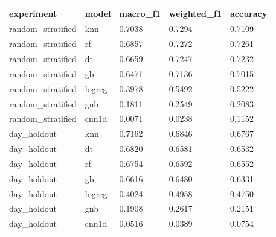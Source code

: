 \begin{tabular}{lllll}
\toprule
       experiment &  model & macro\_f1 & weighted\_f1 & accuracy \\
\midrule
random\_stratified &    knn &   0.7038 &      0.7294 &   0.7109 \\
random\_stratified &     rf &   0.6857 &      0.7272 &   0.7261 \\
random\_stratified &     dt &   0.6659 &      0.7247 &   0.7232 \\
random\_stratified &     gb &   0.6471 &      0.7136 &   0.7015 \\
random\_stratified & logreg &   0.3978 &      0.5492 &   0.5222 \\
random\_stratified &    gnb &   0.1811 &      0.2549 &   0.2083 \\
random\_stratified &  cnn1d &   0.0071 &      0.0238 &   0.1152 \\
      day\_holdout &    knn &   0.7162 &      0.6846 &   0.6767 \\
      day\_holdout &     dt &   0.6820 &      0.6581 &   0.6532 \\
      day\_holdout &     rf &   0.6754 &      0.6592 &   0.6552 \\
      day\_holdout &     gb &   0.6616 &      0.6480 &   0.6331 \\
      day\_holdout & logreg &   0.4024 &      0.4958 &   0.4750 \\
      day\_holdout &    gnb &   0.1908 &      0.2617 &   0.2151 \\
      day\_holdout &  cnn1d &   0.0516 &      0.0389 &   0.0754 \\
\bottomrule
\end{tabular}
